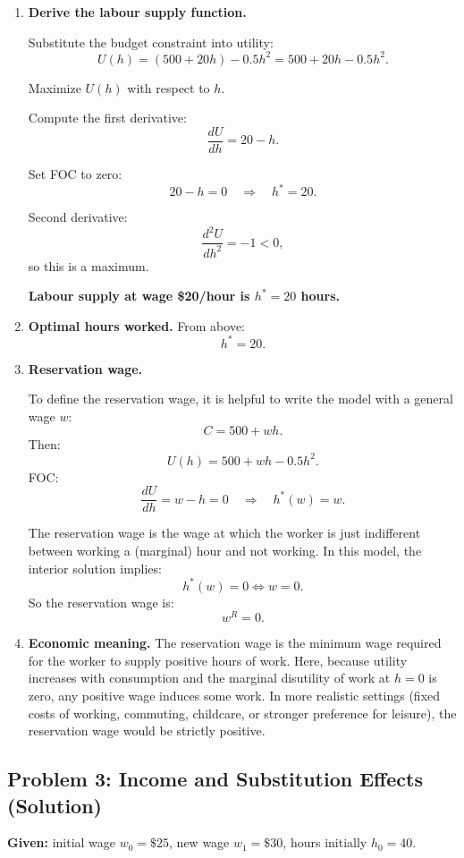 \documentclass[12pt]{article}
\begin{document}
\begin{enumerate}
\item \textbf{Derive the labour supply function.}

Substitute the budget constraint into utility:
\[
U(h) = (500 + 20h) - 0.5h^2 = 500 + 20h - 0.5h^2.
\]

Maximize $U(h)$ with respect to $h$.

Compute the first derivative:
\[
\frac{dU}{dh} = 20 - h.
\]

Set FOC to zero:
\[
20 - h = 0 \quad \Rightarrow \quad h^* = 20.
\]

Second derivative:
\[
\frac{d^2U}{dh^2} = -1 < 0,
\]
so this is a maximum.

\textbf{Labour supply at wage \$20/hour is $h^*=20$ hours.}

\item \textbf{Optimal hours worked.} From above:
\[
h^* = 20.
\]

\item \textbf{Reservation wage.}

To define the reservation wage, it is helpful to write the model with a general wage $w$:
\[
C = 500 + wh.
\]
Then:
\[
U(h) = 500 + wh - 0.5h^2.
\]
FOC:
\[
\frac{dU}{dh} = w - h = 0 \quad \Rightarrow \quad h^*(w) = w.
\]

The reservation wage is the wage at which the worker is just indifferent between working a (marginal) hour and not working. In this model, the interior solution implies:
\[
h^*(w) = 0 \iff w = 0.
\]
So the reservation wage is:
\[
w^R = 0.
\]

\item \textbf{Economic meaning.} The reservation wage is the minimum wage required for the worker to supply positive hours of work. Here, because utility increases with consumption and the marginal disutility of work at $h=0$ is zero, any positive wage induces some work. In more realistic settings (fixed costs of working, commuting, childcare, or stronger preference for leisure), the reservation wage would be strictly positive.
\end{enumerate}

\subsection*{Problem 3: Income and Substitution Effects (Solution)}

\textbf{Given:} initial wage $w_0=\$25$, new wage $w_1=\$30$, hours initially $h_0=40$.
\end{document}

